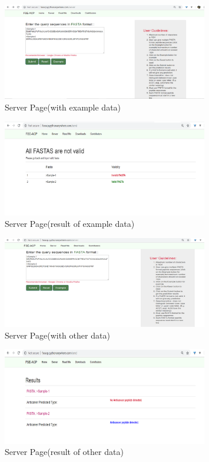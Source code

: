 \begin{figure}[H]
\centering
 \includegraphics[width=0.8\textwidth]{server2.png}
 \caption{Server Page(with example data)}
\end{figure}
\begin{figure}[H]
\centering
 \includegraphics[width=0.8\textwidth]{server3.png}
 \caption{Server Page(result of example data)}
\end{figure}
\begin{figure}[H]
\centering
 \includegraphics[width=0.8\textwidth]{server4.png}
 \caption{Server Page(with other data)}
\end{figure}
\begin{figure}[H]
\centering
 \includegraphics[width=0.8\textwidth]{server5.png}
 \caption{Server Page(result of other data)}
\end{figure}
